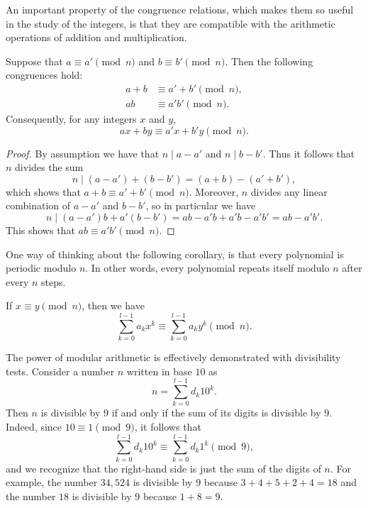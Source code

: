An important property of the congruence relations, which makes them so useful in the study of the integers, is that they are compatible with the arithmetic operations of addition and multiplication.

\begin{proposition}\label{proposition:addition-and-multiplication-congruence}
Suppose that $a \equiv a' \pmod{n}$ and $b \equiv b' \pmod{n}$. Then the following congruences hold:
\[
\begin{aligned}
a+b &\equiv a'+b' \pmod{n},\\[1mm]
ab   &\equiv a'b' \pmod{n}.
\end{aligned}
\]
Consequently, for any integers \(x\) and \(y\),
\[
ax+by \equiv a'x+b'y \pmod{n}.
\]
\end{proposition}

\begin{proof}
  By assumption we have that $n\mid a-a'$ and $n\mid b-b'$. Thus it follows that $n$ divides the sum
  \begin{equation*}
    n\mid (a-a')+(b-b') = (a+b)-(a'+b'),
  \end{equation*}
  which shows that $a+b\equiv a'+b'\pmod{n}$. Moreover, $n$ divides any linear combination of $a-a'$ and $b-b'$, so in particular we have
  \begin{equation*}
    n\mid (a-a')b + a'(b-b') = ab -a'b + a'b - a'b' = ab - a'b'.
  \end{equation*}
  This shows that $ab\equiv a'b'\pmod{n}$.
\end{proof}

One way of thinking about the following corollary, is that every polynomial is periodic modulo $n$. In other words, every polynomial repeats itself modulo $n$ after every $n$ steps.

\begin{corollary}
  If $x\equiv y\pmod {n}$, then we have
  \begin{equation*}
    \sum_{k=0}^{l-1} a_kx^k \equiv \sum_{k=0}^{l-1} a_ky^k \pmod{n}.
  \end{equation*}
\end{corollary}

The power of modular arithmetic is effectively demonstrated with divisibility tests. Consider a number $n$ written in base $10$ as
\begin{equation*}
  n = \sum_{k=0}^{l-1} d_k10^k.
\end{equation*}
Then $n$ is divisible by $9$ if and only if the sum of its digits is divisible by $9$. Indeed, since $10\equiv 1\pmod{9}$, it follows that
\begin{equation*}
  \sum_{k=0}^{l-1} d_k10^k \equiv \sum_{k=0}^{l-1} d_k1^k \pmod{9},
\end{equation*}
and we recognize that the right-hand side is just the sum of the digits of $n$. For example, the number $34,524$ is divisible by $9$ because $3+4+5+2+4=18$ and the number $18$ is divisible by $9$ because $1+8=9$.


